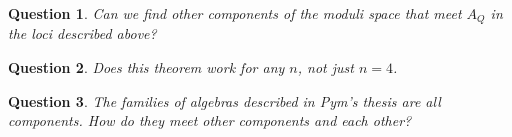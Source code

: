 \documentclass{article}
\newtheorem{question}{Question}
\begin{document}
\begin{question}
Can we find other components of the moduli space that meet $A_Q$ in the loci described above?
\end{question}
\begin{question}
  Does this theorem work for any $n$, not just $n=4$.
\end{question}
\begin{question}
  The families of algebras described in Pym's thesis are all components.  How do they meet other components and each other?
\end{question}
\end{document}
